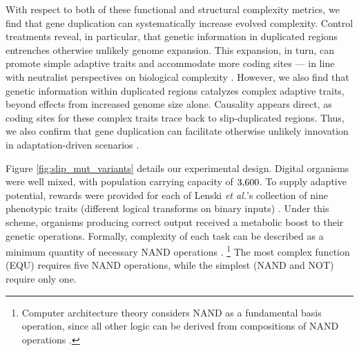 With respect to both of these functional and structural complexity metrics, we find that gene duplication can systematically increase evolved complexity.
Control treatments reveal, in particular, that genetic information in duplicated regions entrenches otherwise unlikely genome expansion.
This expansion, in turn, can promote simple adaptive traits and accommodate more coding sites --- in line with neutralist perspectives on biological complexity \citep{Lynch2000,Beslon2021,Lynch2007}.
However, we also find that genetic information within duplicated regions catalyzes complex adaptive traits, beyond effects from increased genome size alone.
Causality appears direct, as coding sites for these complex traits trace back to slip-duplicated regions.
Thus, we also confirm that gene duplication can facilitate otherwise unlikely innovation in adaptation-driven scenarios \citep{ohno1970evolution}.

Figure \ref{fig:slip_mut_variants} details our experimental design.
Digital organisms were well mixed, with population carrying capacity of $3{\small,}600$.
To supply adaptive potential, rewards were provided for each of Lenski \textit{et al.}'s collection of nine phenotypic traits (different logical transforms on binary inputs) \citep{Lenski2003Evolutionary}.
Under this scheme, organisms producing correct output received a metabolic boost to their genetic operations.
Formally, complexity of each task can be described as a minimum quantity of necessary NAND operations \citep{Lenski2003Evolutionary}.
\unskip\footnote{
Computer architecture theory considers NAND as a fundamental basis operation, since all other logic can be derived from compositions of NAND operations \citep{mano1997logic}.
}
The most complex function (EQU) requires five NAND operations, while the simplest (NAND and NOT) require only one.

